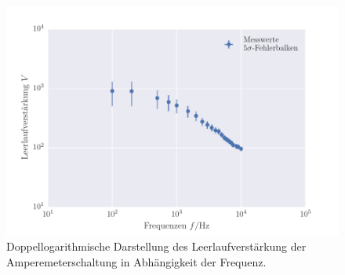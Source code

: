 \FloatBarrier
\begin{figure}[!h]
\centering
\includegraphics[scale=1]{../Grafiken/Amperemeter_Leerlaufverstaerkung.pdf}
\caption{Doppellogarithmische Darstellung des Leerlaufverstärkung der Amperemeterschaltung
	in Abhängigkeit der Frequenz.  \label{fig:amperemeter_leerlaufverstaerkung}}
\end{figure}
\FloatBarrier